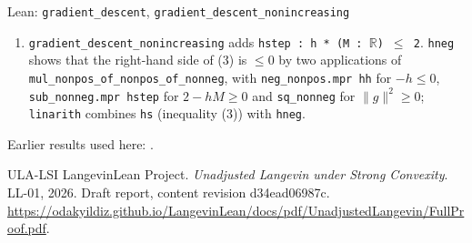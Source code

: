 \documentclass[11pt,a4paper]{article}
\begin{document}
\begin{leanbox}{Lean: \texttt{gradient\_\allowbreak{}descent}, \texttt{gradient\_\allowbreak{}descent\_\allowbreak{}nonincreasing}}
\begin{enumerate}
\item \texttt{gradient\_\allowbreak{}descent\_\allowbreak{}nonincreasing} adds \texttt{hstep : h * (M : \ensuremath{\mathbb R}) \ensuremath{\le} 2}. \texttt{hneg} shows that the right-hand side of (3) is \(\le0\) by two applications of \texttt{mul\_\allowbreak{}nonpos\_\allowbreak{}of\_\allowbreak{}nonpos\_\allowbreak{}of\_\allowbreak{}nonneg}, with \texttt{neg\_\allowbreak{}nonpos.\allowbreak{}mpr hh} for \(-h\le0\), \texttt{sub\_\allowbreak{}nonneg.\allowbreak{}mpr hstep} for \(2-hM\ge0\) and \texttt{sq\_\allowbreak{}nonneg} for \(\|g\|^2\ge0\); \texttt{linarith} combines \texttt{hs} (inequality (3)) with \texttt{hneg}.

\end{enumerate}
\end{leanbox}


Earlier results used here: \cite[Section~3.9.1]{LangevinLean2026ULASC}.

\begin{thebibliography}{ULA-LSI}
LangevinLean Project. \emph{Unadjusted Langevin under Strong Convexity}. LL-01, 2026. Draft report, content revision d34ead06987c. \url{https://odakyildiz.github.io/LangevinLean/docs/pdf/UnadjustedLangevin/FullProof.pdf}.
\end{thebibliography}
\end{document}
